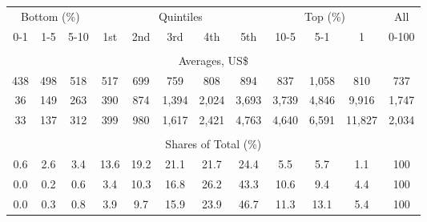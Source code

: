 \begin{tabular}{c c c| c c c c c| c c c| c}
\toprule
\multicolumn{3}{c|}{Bottom (\%)} & \multicolumn{5}{c|}{Quintiles} & \multicolumn{3}{c|}{Top (\%)} & All  \\
0-1 & 1-5 & 5-10 &  1st & 2nd & 3rd & 4th & 5th & 10-5 & 5-1 & 1 & 0-100 \\
\midrule \\
\multicolumn{12}{c}{Averages, US\$} \\
\midrule
438  & 498  & 518  & 517  & 699  & 759  & 808  & 894  & 837  & 1,058  & 810  & 737 \\
36 & 149 & 263 & 390 & 874 & 1,394 & 2,024 & 3,693 & 3,739 & 4,846 & 9,916 & 1,747 \\
33 & 137 & 312 & 399 & 980 & 1,617 & 2,421 & 4,763 & 4,640 & 6,591 & 11,827 & 2,034 \\
\midrule \\
\multicolumn{12}{c}{Shares of Total (\%)} \\
\midrule
0.6   & 2.6   & 3.4   & 13.6   & 19.2   & 21.1   & 21.7   & 24.4   & 5.5   & 5.7   & 1.1   & 100 \\
0.0  & 0.2  & 0.6  & 3.4  & 10.3  & 16.8  & 26.2  & 43.3  & 10.6  & 9.4  & 4.4  & 100 \\
0.0  & 0.3  & 0.8  & 3.9  & 9.7  & 15.9  & 23.9  & 46.7  & 11.3  & 13.1  & 5.4  & 100 \\
\bottomrule
\end{tabular}